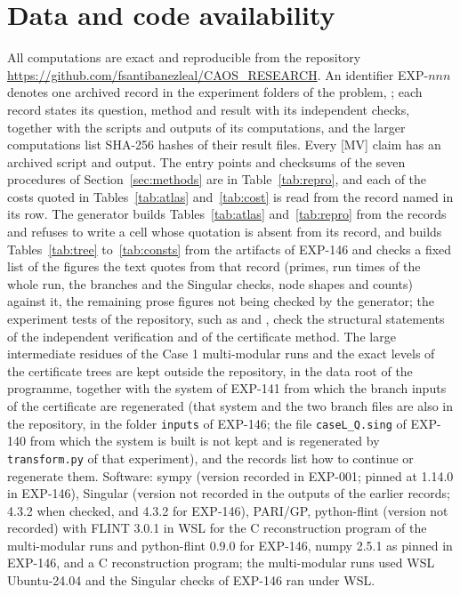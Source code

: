 \documentclass[11pt]{article}
\theoremstyle{remark}
\begin{document}
\section*{Data and code availability}

{\raggedright
All computations are exact and reproducible from the repository
\url{https://github.com/fsantibanezleal/CAOS_RESEARCH}. An identifier EXP-$nnn$ denotes
one archived record in the experiment folders of the problem,
; each record states its
question, method and result with its independent checks, together with the scripts and
outputs of its computations, and the larger computations list SHA-256 hashes of their result
files. Every [MV] claim has an archived script and output. The entry points and checksums of the seven procedures of
Section~\ref{sec:methods} are in Table~\ref{tab:repro}, and each of the costs quoted in Tables~\ref{tab:atlas} and~\ref{tab:cost} is read from the record named in its row. The generator
 builds Tables~\ref{tab:atlas} and~\ref{tab:repro} from the records and refuses to write a cell whose quotation is absent from its
record, and builds Tables~\ref{tab:tree} to~\ref{tab:consts} from the artifacts of EXP-146 and checks a fixed list of the figures the text quotes from that record (primes, run times of the whole run, the branches and the Singular checks, node shapes and counts) against it, the remaining prose figures not being checked by the generator; the experiment tests of the repository, such as  and
, check the structural statements of the independent verification and of the certificate method. The large intermediate residues of the
Case 1 multi-modular runs and the exact levels of the certificate trees are kept outside the repository, in the data root of the programme, together with the system of EXP-141 from which the branch inputs of the certificate are regenerated (that system and the two branch files are also in the repository, in the folder \texttt{inputs} of EXP-146; the file \texttt{caseL\_Q.sing} of EXP-140 from which the system is built is not kept and is regenerated by \texttt{transform.py} of that experiment), and the records list how to continue or regenerate them. Software: sympy (version recorded in EXP-001; pinned at 1.14.0 in EXP-146), Singular (version not
recorded in the outputs of the earlier records; 4.3.2 when checked, and 4.3.2 for EXP-146), PARI/GP, python-flint (version not recorded) with FLINT 3.0.1 in WSL for the C reconstruction program of the multi-modular runs and python-flint 0.9.0 for EXP-146, numpy 2.5.1 as pinned in EXP-146, and a C reconstruction program; the multi-modular runs used WSL Ubuntu-24.04 and the Singular checks of EXP-146 ran under WSL.\par}
\end{document}
